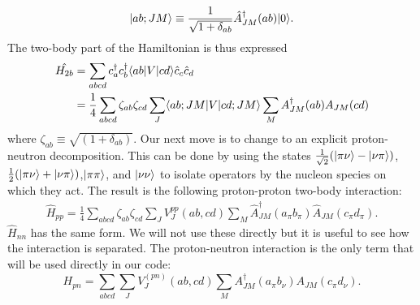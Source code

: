 \begin{equation}
    |ab; JM\rangle \equiv \frac{1}{\sqrt{1+\delta_{ab}}}
       \hat{A}^\dagger_{JM}(ab)|0\rangle.
\end{equation}
The two-body part of the Hamiltonian is thus expressed
\begin{equation}\begin{split}
    \hat{H_{2b}} &= \sum_{abcd}{c}^\dagger_a{c}^\dagger_b\langle ab|V|cd\rangle
        \hat{c}_c\hat{c}_d \\
    &= \frac{1}{4}\sum_{abcd}\zeta_{ab}\zeta_{cd}
    \sum_{J}\langle ab;JM|V|cd;JM\rangle\sum_{M}{A}^\dagger_{JM}(ab){A}_{JM}(cd)
\end{split}\end{equation}
where $\zeta_{ab}\equiv\sqrt{(1+\delta_{ab})}$.
Our next move is to change to an explicit proton-neutron decomposition.
This can be done by using the states $\frac{1}{\sqrt{2}}
(|\pi\nu\rangle-|\nu\pi\rangle)$, $\frac{1}{2}(|\pi\nu\rangle+|\nu\pi\rangle)$,$|\pi\pi\rangle
$, and $|\nu\nu\rangle$ to isolate operators by the nucleon species on which they act. 
The result is the following proton-proton two-body interaction:
\begin{equation}\begin{split}
    \hat{H}_{pp} =
    \frac{1}{4}\sum_{abcd}\zeta_{ab}\zeta_{cd}
    \sum_{J}V_{J}^{pp}(ab,cd)\sum_{M}\hat{A}^\dagger_{JM}(a_\pi b_\pi)\hat{A}_{JM}(c_\pi d_\pi).
\end{split}\end{equation}
$\hat{H}_{nn}$ has the same form. We will not use these directly but it is 
useful to see how the interaction is separated. The proton-neutron interaction is
the only term that will be used directly in our code:
\begin{equation} \label{eqn: hpn}
    H_{pn} = \sum_{abcd}\sum_J V_J^{(pn)}(ab,cd) 
\sum_M A_{JM}^\dagger(a_\pi b_\nu) A_{JM}(c_\pi d_\nu).
\end{equation}


